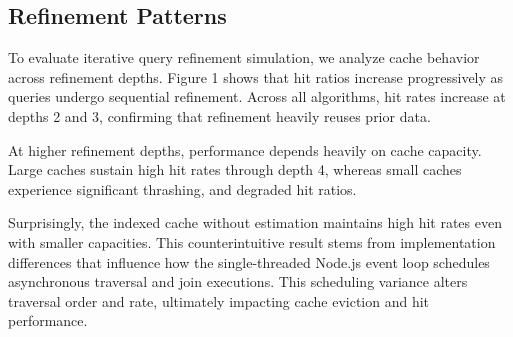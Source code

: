 \subsection{Refinement Patterns}

To evaluate iterative query refinement simulation, 
we analyze cache behavior across refinement depths. 
Figure 1 shows that hit ratios increase progressively 
as queries undergo sequential refinement. 
Across all algorithms, hit rates increase at depths 2 and 3, 
confirming that refinement heavily reuses prior data.

At higher refinement depths, 
performance depends heavily on cache capacity. 
Large caches sustain high hit rates through depth 4, 
whereas small caches experience significant thrashing,
and degraded hit ratios. 

Surprisingly, the indexed cache without estimation 
maintains high hit rates even with smaller capacities. 
This counterintuitive result stems from implementation differences 
that influence how the single-threaded Node.js event loop 
schedules asynchronous traversal and join executions. 
This scheduling variance alters traversal order and rate, 
ultimately impacting cache eviction and hit performance.





